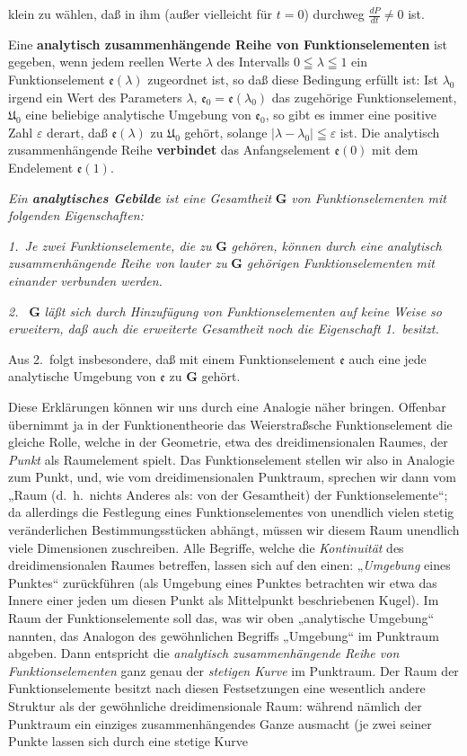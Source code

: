 \documentclass{article}
\begin{document}
klein zu wählen, daß in ihm (außer vielleicht für $t = 0$) durchweg $\frac{dP}{dt} \neq 0$ ist.

Eine \textbf{analytisch zusammenhängende Reihe von Funktionselementen} ist gegeben, wenn jedem reellen Werte $\lambda$ des Intervalls $0 \leqq \lambda \leqq 1$ ein Funktionselement $\mathfrak{e}(\lambda)$ zugeordnet ist, so daß diese Bedingung erfüllt ist: Ist $\lambda_0$ irgend ein Wert des Parameters $\lambda$, $\mathfrak{e}_0 = \mathfrak{e}(\lambda_0)$ das zugehörige Funktionselement, $\mathfrak{U}_0$ eine beliebige analytische Umgebung von $\mathfrak{e}_0$, so gibt es immer eine positive Zahl $\varepsilon$ derart, daß $\mathfrak{e}(\lambda)$ zu $\mathfrak{U}_0$ gehört, solange $|\lambda - \lambda_0| \leqq \varepsilon$ ist. Die analytisch zusammenhängende Reihe \textbf{verbindet} das Anfangselement $\mathfrak{e}(0)$ mit dem Endelement $\mathfrak{e}(1)$.

\emph{Ein \textbf{analytisches Gebilde} ist eine Gesamtheit} $\mathbf{G}$ \emph{von Funktionselementen mit folgenden Eigenschaften:}

\emph{1.\ Je zwei Funktionselemente, die zu} $\mathbf{G}$ \emph{gehören, können durch eine analytisch zusammenhängende Reihe von lauter zu} $\mathbf{G}$ \emph{gehörigen Funktionselementen mit einander verbunden werden.}

\emph{2.\ } $\mathbf{G}$ \emph{läßt sich durch Hinzufügung von Funktionselementen auf keine Weise so erweitern, daß auch die erweiterte Gesamtheit noch die Eigenschaft 1.\ besitzt.}

Aus 2.\ folgt insbesondere, daß mit einem Funktionselement $\mathfrak{e}$ auch eine jede analytische Umgebung von $\mathfrak{e}$ zu $\mathbf{G}$ gehört.

Diese Erklärungen können wir uns durch eine Analogie näher bringen. Offenbar übernimmt ja in der Funktionentheorie das Weierstraßsche Funktionselement die gleiche Rolle, welche in der Geometrie, etwa des dreidimensionalen Raumes, der \emph{Punkt} als Raumelement spielt. Das Funktionselement stellen wir also in Analogie zum Punkt, und, wie vom dreidimensionalen Punktraum, sprechen wir dann vom „Raum (d.\ h.\ nichts Anderes als: von der Gesamtheit) der Funktionselemente“; da allerdings die Festlegung eines Funktionselementes von unendlich vielen stetig veränderlichen Bestimmungsstücken abhängt, müssen wir diesem Raum unendlich viele Dimensionen zuschreiben. Alle Begriffe, welche die \emph{Kontinuität} des dreidimensionalen Raumes betreffen, lassen sich auf den einen: „\emph{Umgebung} eines Punktes“ zurückführen (als Umgebung eines Punktes betrachten wir etwa das Innere einer jeden um diesen Punkt als Mittelpunkt beschriebenen Kugel). Im Raum der Funktionselemente soll das, was wir oben „analytische Umgebung“ nannten, das Analogon des gewöhnlichen Begriffs „Umgebung“ im Punktraum abgeben. Dann entspricht die \emph{analytisch zusammenhängende Reihe von Funktionselementen} ganz genau der \emph{stetigen Kurve} im Punktraum. Der Raum der Funktionselemente besitzt nach diesen Festsetzungen eine wesentlich andere Struktur als der gewöhnliche dreidimensionale Raum: während nämlich der Punktraum ein einziges zusammenhängendes Ganze ausmacht (je zwei seiner Punkte lassen sich durch eine stetige Kurve
\end{document}
